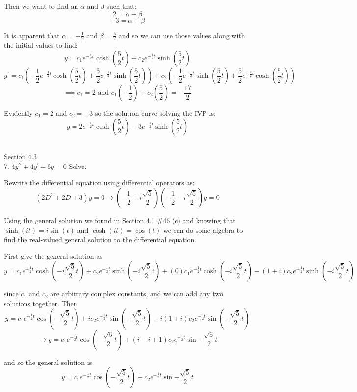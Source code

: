\documentclass[11pt]{article}
\newcommand{\br}[1]{\left(#1\right)}
\newcommand{\dprime}{\prime\prime}
\begin{document}
Then we want to find an $\alpha$ and $\beta$ such that:
$$2 = \alpha + \beta$$
$$-3 = \alpha - \beta$$

It is apparent that $\alpha = -\frac{1}{2}$ and $\beta = \frac{5}{2}$ and so we can use those values along with the initial values to find:
$$y = c_1e^{-\frac{1}{2} t}\cosh(\frac{5}{2} t) + c_2e^{-\frac{1}{2} t}\sinh(\frac{5}{2} t)$$
$$y^{\prime} = c_1\br{-\frac{1}{2}e^{-\frac{1}{2} t}\cosh(\frac{5}{2} t) + \frac{5}{2}e^{-\frac{1}{2} t}\sinh(\frac{5}{2}t)} + c_2\br{-\frac{1}{2}e^{-\frac{1}{2} t}\sinh(\frac{5}{2} t) + \frac{5}{2}e^{-\frac{1}{2} t}\cosh(\frac{5}{2}t)}$$
$$\implies c_1 = 2 \text{ and } c_1\br{-\frac{1}{2}} + c_2\br{\frac{5}{2}} = -\frac{17}{2}$$

Evidently $c_1 = 2$ and $c_2 = -3$ so the solution curve solving the IVP is:
$$y = 2e^{-\frac{1}{2} t}\cosh(\frac{5}{2} t) - 3e^{-\frac{1}{2} t}\sinh(\frac{5}{2} t)$$ \\

\newpage

Section 4.3 \\

7. $4y^{\dprime} + 4y^{\prime} +6y = 0$ Solve.

Rewrite the differential equation using differential operators as:
$$\br{2D^2 + 2D + 3}y = 0 \to \br{-\frac{1}{2}+i\frac{\sqrt{5}}{2}}\br{-\frac{1}{2}-i\frac{\sqrt{5}}{2}}y = 0$$

Using the general solution we found in Section 4.1 \#46 (c) and knowing that $\sinh(it) = i\sin(t)$ and $\cosh(it) = \cos(t)$ we can do some algebra to find the real-valued general solution to the differential equation.

First give the general solution as
$$y = c_1e^{-\frac{1}{2} t}\cosh(-i\frac{\sqrt{5}}{2} t) + c_2e^{-\frac{1}{2} t}\sinh(-i\frac{\sqrt{5}}{2} t) + (0)c_1e^{-\frac{1}{2} t}\cosh(-i\frac{\sqrt{5}}{2} t) - (1+i)c_2e^{-\frac{1}{2} t}\sinh(-i\frac{\sqrt{5}}{2} t)$$

since $c_1$ and $c_2$ are arbitrary complex constants, and we can add any two solutions together. Then
$$y = c_1e^{-\frac{1}{2} t}\cos(-\frac{\sqrt{5}}{2} t) + ic_2e^{-\frac{1}{2} t}\sin(-\frac{\sqrt{5}}{2} t) - i(1+i)c_2e^{-\frac{1}{2} t}\sin(-\frac{\sqrt{5}}{2} t)$$
$$\to y = c_1e^{-\frac{1}{2} t}\cos(-\frac{\sqrt{5}}{2} t) + (i - i + 1)c_2e^{-\frac{1}{2} t}\sin{-\frac{\sqrt{5}}{2} t}$$

and so the general solution is
$$y = c_1e^{-\frac{1}{2} t}\cos(-\frac{\sqrt{5}}{2} t) + c_2e^{-\frac{1}{2} t}\sin{-\frac{\sqrt{5}}{2} t}$$
\end{document}
